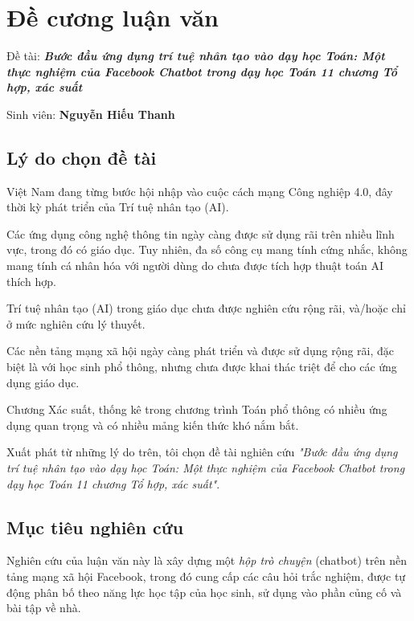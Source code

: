 \chapter*{Đề cương luận văn}

Đề tài: \textit{\textbf{Bước đầu ứng dụng trí tuệ nhân tạo vào dạy học Toán: Một thực nghiệm của Facebook Chatbot trong dạy học Toán 11 chương Tổ hợp, xác suất}}\par
Sinh viên: \textbf{Nguyễn Hiếu Thanh}\par
\renewcommand*{\thesection}{\arabic{section}}
\renewcommand*{\thesubsection}{\alph{subsection}}

\section{Lý do chọn đề tài}
Việt Nam đang từng bước hội nhập vào cuộc cách mạng Công nghiệp 4.0, đây thời kỳ phát triển của Trí tuệ nhân tạo (AI).\par
Các ứng dụng công nghệ thông tin ngày càng được sử dụng rãi trên nhiều lĩnh vực, trong đó có giáo dục. Tuy nhiên, đa số công cụ mang tính cứng nhắc, không mang tính cá nhân hóa với người dùng do chưa được tích hợp thuật toán AI thích hợp.\par
Trí tuệ nhân tạo (AI) trong giáo dục chưa được nghiên cứu rộng rãi, và/hoặc chỉ ở mức nghiên cứu lý thuyết.\par
Các nền tảng mạng xã hội ngày càng phát triển và được sử dụng rộng rãi, đặc biệt là với học sinh phổ thông, nhưng chưa được khai thác triệt để cho các ứng dụng giáo dục.\par
Chương Xác suất, thống kê trong chương trình Toán phổ thông có nhiều ứng dụng quan trọng và có nhiều mảng kiến thức khó nắm bắt.\par
Xuất phát từ những lý do trên, tôi chọn đề tài nghiên cứu \textit{"Bước đầu ứng dụng trí tuệ nhân tạo vào dạy học Toán: Một thực nghiệm của Facebook Chatbot trong dạy học Toán 11 chương Tổ hợp, xác suất"}.\par

\section{Mục tiêu nghiên cứu}
Nghiên cứu của luận văn này là xây dựng một \textit{hộp trò chuyện} (chatbot) trên nền tảng mạng xã hội Facebook, trong đó cung cấp các câu hỏi trắc nghiệm, được tự động phân bố theo năng lực học tập của học sinh, sử dụng vào phần củng cố và bài tập về nhà.
